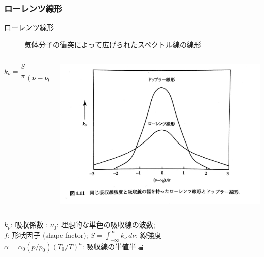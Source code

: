 \documentclass[unicode,colorlinks]{beamer}
\newcommand{\centeralign}[1]{\rule{0pt}{0pt}\hfill#1\hfill\rule{0pt}{0pt}}
\newcommand{\Unit}[1]{\,\mathrm{#1}}
\begin{document}
\begin{frame}
	\frametitle{ローレンツ線形}
	\begin{description}
		\item[ローレンツ線形] 気体分子の衝突によって広げられたスペクトル線の線形
	\end{description}

	\begin{columns}
		\begin{column}{0.6\textwidth}
			\[k_\nu=\frac{S}{\pi}\frac{\alpha}{(\nu-\nu_0)^2+\alpha^2}=Sf[\nu-\nu_0]\]
		\end{column}
		\begin{column}{0.3\textwidth}
			\centeralign{\includegraphics[width=\textwidth]{lorentz.jpg}}
		\end{column}
	\end{columns}

	$k_\nu$: 吸収係数 ;\quad
	$\nu_0$: 理想的な単色の吸収線の波数;\\
	$f$: 形状因子 (shape factor);\quad
	$\displaystyle S=\int^\infty_{-\infty}k_\nu\,d\nu$: 線強度\\
	$\alpha=\alpha_0(p/p_0)(T_0/T)^n$: 吸収線の半値半幅
\end{frame}

% 
% 
\end{document}

